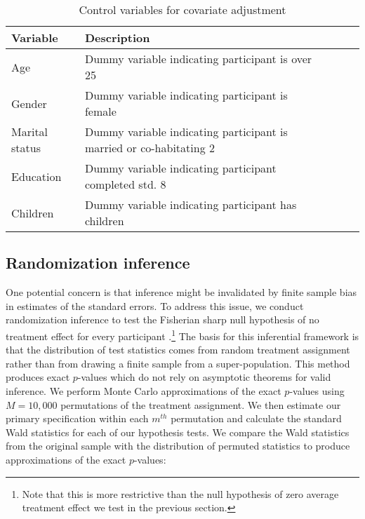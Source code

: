 \documentclass[11pt, a4paper]{article}\usepackage[]{graphicx}\usepackage[]{color}
\begin{document}
        \begin{table}[h]
        \centering
        \caption{Control variables for covariate adjustment}
        \label{tab:controlvars}
        \begin{tabular}{@{}lllll@{}}
        \toprule
        Variable                                     & Description                                          &  &  &  \\ \midrule
        Age & Dummy variable indicating participant is over 25 &  &  &  \\
        Gender & Dummy variable indicating participant is female &  &  &  \\
        Marital status & Dummy variable indicating participant is married or co-habitating 2 &  &  &  \\
        Education & Dummy variable indicating participant completed std. 8 &  &  &  \\
        Children & Dummy variable indicating participant has children &  &  &  \\ \bottomrule
        \end{tabular}
        \end{table}


    \subsection{Randomization inference}

        One potential concern is that inference might be invalidated by finite sample bias in estimates of the standard errors. To address this issue, we conduct randomization inference to test the Fisherian sharp null hypothesis of no treatment effect for every participant \parencite{fisher_design_1935}.\footnote{Note that this is more restrictive than the null hypothesis of zero average treatment effect we test in the previous section.} The basis for this inferential framework is that the distribution of test statistics comes from random treatment assignment rather than from drawing a finite sample from a super-population. This method produces exact $p$-values which do not rely on asymptotic theorems for valid inference. We perform Monte Carlo approximations of the exact $p$-values using $M=10,000$ permutations of the treatment assignment. We then estimate our primary specification within each $m^{th}$ permutation and calculate the standard Wald statistics for each of our hypothesis tests. We compare the Wald statistics from the original sample with the distribution of permuted statistics to produce approximations of the exact $p$-values:
\end{document}
